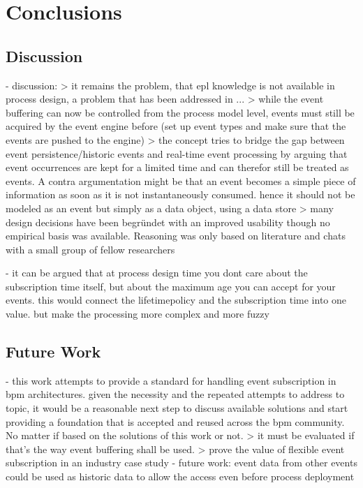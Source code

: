 \chapter{Conclusions}\label{ch:conclusion}

\section{Discussion}

- discussion:
> it remains the problem, that epl knowledge is not available in process design, a problem that has been addressed in ...
> while the event buffering can now be controlled from the process model level, events must still be acquired by the event engine before (set up event types and make sure that the events are pushed to the engine)
> the concept tries to bridge the gap between event persistence/historic events and real-time event processing by arguing that event occurrences are kept for a limited time and can therefor still be treated as events. A contra argumentation might be that an event becomes a simple piece of information as soon as it is not instantaneously consumed. hence it should not be modeled as an event but simply as a data object, using a data store
> many design decisions have been begründet with an improved usability though no empirical basis was available. Reasoning was only based on literature and chats with a small group of fellow researchers

- it can be argued that at process design time you dont care about the subscription time itself, but about the maximum age you can accept for your events. this would connect the lifetimepolicy and the subscription time into one value. but make the processing more complex and more fuzzy

\section{Future Work}


- this work attempts to provide a standard for handling event subscription in bpm architectures. given the necessity and the repeated attempts to address to topic, it would be a reasonable next step to discuss available solutions and start providing a foundation that is accepted and reused across the bpm community. No matter if based on the solutions of this work or not.
> it must be evaluated if that's the way event buffering shall be used. > prove the value of flexible event subscription in an industry case study
- future work: event data from other events could be used as historic data to allow the access even before process deployment
